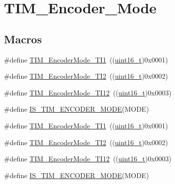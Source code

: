 \hypertarget{group___t_i_m___encoder___mode}{}\section{T\+I\+M\+\_\+\+Encoder\+\_\+\+Mode}
\label{group___t_i_m___encoder___mode}
\subsection*{Macros}
\begin{DoxyCompactItemize}
\item 
\#define \hyperlink{group___t_i_m___encoder___mode_gabc63e3617a938382f87439ec58768b8e}{T\+I\+M\+\_\+\+Encoder\+Mode\+\_\+\+T\+I1}~((\hyperlink{_p_e___types_8h_a1f1825b69244eb3ad2c7165ddc99c956}{uint16\+\_\+t})0x0001)
\item 
\#define \hyperlink{group___t_i_m___encoder___mode_ga5627a2d5d47b7301c7dbb29d20ae00e3}{T\+I\+M\+\_\+\+Encoder\+Mode\+\_\+\+T\+I2}~((\hyperlink{_p_e___types_8h_a1f1825b69244eb3ad2c7165ddc99c956}{uint16\+\_\+t})0x0002)
\item 
\#define \hyperlink{group___t_i_m___encoder___mode_ga12511f903de08f1a634ff7828757f081}{T\+I\+M\+\_\+\+Encoder\+Mode\+\_\+\+T\+I12}~((\hyperlink{_p_e___types_8h_a1f1825b69244eb3ad2c7165ddc99c956}{uint16\+\_\+t})0x0003)
\item 
\#define \hyperlink{group___t_i_m___encoder___mode_ga9dd5baa6b2a44e0f25068a650cbfdd1b}{I\+S\+\_\+\+T\+I\+M\+\_\+\+E\+N\+C\+O\+D\+E\+R\+\_\+\+M\+O\+DE}(M\+O\+DE)
\item 
\#define \hyperlink{group___t_i_m___encoder___mode_gabc63e3617a938382f87439ec58768b8e}{T\+I\+M\+\_\+\+Encoder\+Mode\+\_\+\+T\+I1}~((\hyperlink{_p_e___types_8h_a1f1825b69244eb3ad2c7165ddc99c956}{uint16\+\_\+t})0x0001)
\item 
\#define \hyperlink{group___t_i_m___encoder___mode_ga5627a2d5d47b7301c7dbb29d20ae00e3}{T\+I\+M\+\_\+\+Encoder\+Mode\+\_\+\+T\+I2}~((\hyperlink{_p_e___types_8h_a1f1825b69244eb3ad2c7165ddc99c956}{uint16\+\_\+t})0x0002)
\item 
\#define \hyperlink{group___t_i_m___encoder___mode_ga12511f903de08f1a634ff7828757f081}{T\+I\+M\+\_\+\+Encoder\+Mode\+\_\+\+T\+I12}~((\hyperlink{_p_e___types_8h_a1f1825b69244eb3ad2c7165ddc99c956}{uint16\+\_\+t})0x0003)
\item 
\#define \hyperlink{group___t_i_m___encoder___mode_ga9dd5baa6b2a44e0f25068a650cbfdd1b}{I\+S\+\_\+\+T\+I\+M\+\_\+\+E\+N\+C\+O\+D\+E\+R\+\_\+\+M\+O\+DE}(M\+O\+DE)
\end{DoxyCompactItemize}


